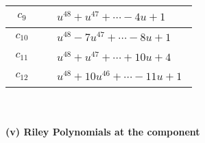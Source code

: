 \documentclass[1p]{elsarticle_modified}
\theoremstyle{definition}
\begin{document}
\begin{tabular}{m{50pt}|m{274pt}}
\hline $$\begin{aligned}c_{9}\end{aligned}$$&$\begin{aligned}
&u^{48}+u^{47}+\cdots-4 u+1
\end{aligned}$\\
\hline $$\begin{aligned}c_{10}\end{aligned}$$&$\begin{aligned}
&u^{48}-7 u^{47}+\cdots-8 u+1
\end{aligned}$\\
\hline $$\begin{aligned}c_{11}\end{aligned}$$&$\begin{aligned}
&u^{48}+u^{47}+\cdots+10 u+4
\end{aligned}$\\
\hline $$\begin{aligned}c_{12}\end{aligned}$$&$\begin{aligned}
&u^{48}+10 u^{46}+\cdots-11 u+1
\end{aligned}$\\
\hline
\end{tabular}\\~\\
\newpage\renewcommand{\arraystretch}{1}
\flushleft \textbf{(v) Riley Polynomials at the component}\newline \\
\end{document}
